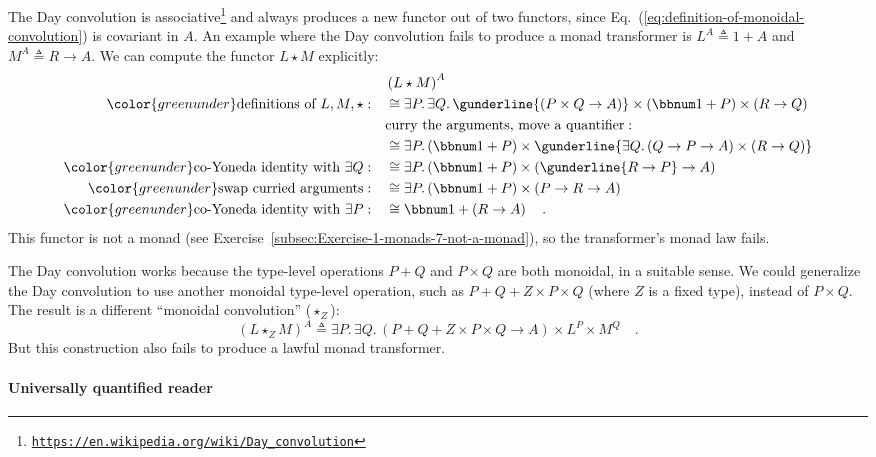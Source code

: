 The Day convolution is associative\footnote{\texttt{\href{https://en.wikipedia.org/wiki/Day_convolution}{https://en.wikipedia.org/wiki/Day\_convolution}}}
and always produces a new functor out of two functors, since Eq.~(\ref{eq:definition-of-monoidal-convolution})
is covariant in $A$. An example where the Day convolution fails to
produce a monad transformer is $L^{A}\triangleq1+A$ and $M^{A}\triangleq R\rightarrow A$.
We can compute the functor $L\star M$ explicitly:
\begin{align*}
 & \left(L\star M\right)^{A}\\
{\color{greenunder}\text{definitions of }L,M,\star:}\quad & \cong\exists P.\,\exists Q.\,\gunderline{\left(P\times Q\rightarrow A\right)}\times\left(\bbnum 1+P\right)\times\left(R\rightarrow Q\right)\\
 & \text{curry the arguments, move a quantifier}:\quad\\
 & \cong\exists P.\left(\bbnum 1+P\right)\times\gunderline{\exists Q.\left(Q\rightarrow P\rightarrow A\right)\times\left(R\rightarrow Q\right)}\\
{\color{greenunder}\text{co-Yoneda identity with }\exists Q:}\quad & \cong\exists P.\left(\bbnum 1+P\right)\times\left(\gunderline{R\rightarrow P}\rightarrow A\right)\\
{\color{greenunder}\text{swap curried arguments}:}\quad & \cong\exists P.\left(\bbnum 1+P\right)\times\left(P\rightarrow R\rightarrow A\right)\\
{\color{greenunder}\text{co-Yoneda identity with }\exists P:}\quad & \cong\bbnum 1+\left(R\rightarrow A\right)\quad.
\end{align*}
This functor is not a monad (see Exercise~\ref{subsec:Exercise-1-monads-7-not-a-monad}),
so the transformer\textsf{'}s monad law fails.

The Day convolution works because the type-level operations $P+Q$
and $P\times Q$ are both monoidal, in a suitable sense. We could
generalize the Day convolution to use another monoidal type-level
operation, such as $P+Q+Z\times P\times Q$ (where $Z$ is a fixed
type), instead of $P\times Q$. The result is a different \textsf{``}monoidal
convolution\textsf{''} ($\star_{Z}$):
\[
\left(L\star_{Z}M\right)^{A}\triangleq\exists P.\,\exists Q.\,\left(P+Q+Z\times P\times Q\rightarrow A\right)\times L^{P}\times M^{Q}\quad.
\]
But this construction also fails to produce a lawful monad transformer.

\paragraph{Universally quantified reader}

